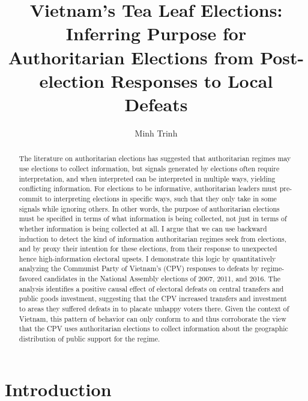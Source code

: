 \documentclass[12pt]{article}\usepackage[]{graphicx}\usepackage[]{color}
\title{Vietnam's Tea Leaf Elections: \\
	Inferring Purpose for Authoritarian Elections from Post-election Responses to Local Defeats}
\author{Minh Trinh}
\newcommand{\1}{\mathbbm{1}}
\begin{document}
\maketitle

\begin{abstract}
The literature on authoritarian elections has suggested that authoritarian regimes may use elections to collect information, but signals generated by elections often require interpretation, and when interpreted can be interpreted in multiple ways, yielding conflicting information. For elections to be informative, authoritarian leaders must pre-commit to interpreting elections in specific ways, such that they only take in some signals while ignoring others. In other words, the purpose of authoritarian elections must be specified in terms of what information is being collected, not just in terms of whether information is being collected at all. I argue that we can use backward induction to detect the kind of information authoritarian regimes seek from elections, and by proxy their intention for these elections, from their response to unexpected hence high-information electoral upsets. I demonstrate this logic by quantitatively analyzing the Communist Party of Vietnam's (CPV) responses to defeats by regime-favored candidates in the National Assembly elections of 2007, 2011, and 2016. The analysis identifies a positive causal effect of electoral defeats on central transfers and public goods investment, suggesting that the CPV increased transfers and investment to areas they suffered defeats in to placate unhappy voters there. Given the context of Vietnam, this pattern of behavior can only conform to and thus corroborate the view that the CPV uses authoritarian elections to collect information about the geographic distribution of public support for the regime.
\end{abstract}

\doublespacing

\section{Introduction}
\end{document}
